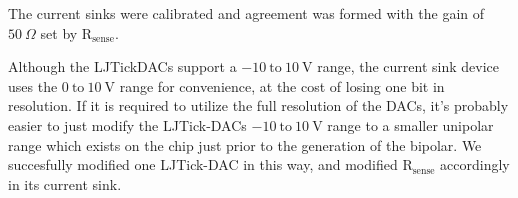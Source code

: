 
The current sinks were calibrated and agreement was formed with the gain of $50~\Omega$ set by $\mathrm{R_{sense}}$.  


Although the LJTickDACs support a $\mathrm{-10~to~10~V}$ range, the current sink device uses the $\mathrm{0~to~10~V}$ range for convenience, at the cost of losing one bit in resolution. If it is required to utilize the full resolution of the DACs,  it's probably easier to just modify the LJTick-DACs $\mathrm{-10~to~10~V}$ range to a smaller unipolar range which exists on the chip just prior to the generation of the bipolar. We succesfully modified one LJTick-DAC in this way, and modified $\mathrm{R_{sense}}$ accordingly in its current sink. 


